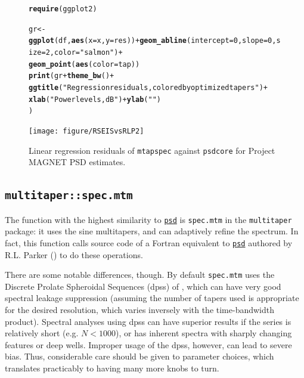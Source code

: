 \documentclass[10pt]{article}\usepackage[]{graphicx}\usepackage[]{color}
\makeatletter
\newcommand{\hlnum}[1]{\textcolor[rgb]{0.686,0.059,0.569}{#1}}%
\newcommand{\hlstr}[1]{\textcolor[rgb]{0.192,0.494,0.8}{#1}}%
\newcommand{\hlopt}[1]{\textcolor[rgb]{0,0,0}{#1}}%
\newcommand{\hlstd}[1]{\textcolor[rgb]{0.345,0.345,0.345}{#1}}%
\newcommand{\hlkwb}[1]{\textcolor[rgb]{0.69,0.353,0.396}{#1}}%
\newcommand{\hlkwc}[1]{\textcolor[rgb]{0.333,0.667,0.333}{#1}}%
\newcommand{\hlkwd}[1]{\textcolor[rgb]{0.737,0.353,0.396}{\textbf{#1}}}%
\newenvironment{kframe}{%
 \def\at@end@of@kframe{}%
 \ifinner\ifhmode%
  \def\at@end@of@kframe{\end{minipage}}%
  \begin{minipage}{\columnwidth}%
 \fi\fi%
 \def\FrameCommand##1{\hskip\@totalleftmargin \hskip-\fboxsep
 \colorbox{shadecolor}{##1}\hskip-\fboxsep
     \hskip-\linewidth \hskip-\@totalleftmargin \hskip\columnwidth}%
 \MakeFramed {\advance\hsize-\width
   \@totalleftmargin\z@ \linewidth\hsize
   \@setminipage}}%
 {\par\unskip\endMakeFramed%
 \at@end@of@kframe}
\newenvironment{knitrout}{}{} %
\newcommand{\Rcmd}[1]{\texttt{#1}}
\newcommand{\psd}[0]{\href{http://abarbour.github.com/psd/}{\color{blue}\Rcmd{psd}}}
\makeatother
\begin{document}
\begin{figure}[htb!]
\begin{center}
\begin{knitrout}
\color{fgcolor}\begin{kframe}
\begin{alltt}
\hlkwd{require}\hlstd{(ggplot2)}
\end{alltt}


{\ttfamily\noindent\itshape\color{messagecolor}{\#\# Loading required package: ggplot2}}\begin{alltt}
\hlstd{gr} \hlkwb{<-} \hlkwd{ggplot}\hlstd{(df,} \hlkwd{aes}\hlstd{(}\hlkwc{x}\hlstd{=x,} \hlkwc{y}\hlstd{=res))} \hlopt{+} \hlkwd{geom_abline}\hlstd{(}\hlkwc{intercept}\hlstd{=}\hlnum{0}\hlstd{,} \hlkwc{slope}\hlstd{=}\hlnum{0}\hlstd{,} \hlkwc{size}\hlstd{=}\hlnum{2}\hlstd{,} \hlkwc{color}\hlstd{=}\hlstr{"salmon"}\hlstd{)} \hlopt{+}
\hlkwd{geom_point}\hlstd{(}\hlkwd{aes}\hlstd{(}\hlkwc{color}\hlstd{=tap))}
\hlkwd{print}\hlstd{(gr} \hlopt{+} \hlkwd{theme_bw}\hlstd{()} \hlopt{+}
\hlkwd{ggtitle}\hlstd{(}\hlstr{"Regression residuals, colored by optimized tapers"}\hlstd{)}\hlopt{+}
\hlkwd{xlab}\hlstd{(}\hlstr{"Power levels, dB"}\hlstd{)} \hlopt{+} \hlkwd{ylab}\hlstd{(}\hlstr{""}\hlstd{)}
\hlstd{)}
\end{alltt}
\end{kframe}
\texttt{[image: figure/RSEISvsRLP2]} 

\end{knitrout}
\caption{Linear regression residuals of
\Rcmd{mtapspec} against \Rcmd{psdcore} for Project MAGNET PSD estimates.}
\label{fig:psdreg}
\end{center}
\end{figure}

\subsection{\Rcmd{multitaper::spec.mtm}}
The function with the highest similarity to \psd{} is
\Rcmd{spec.mtm} in the \Rcmd{multitaper} package: it uses
the sine multitapers, and can adaptively refine the spectrum.
In fact, this function
calls source code of a Fortran equivalent to \psd{}
authored by R.L. Parker (\citeyear{parkerweb}) to do these operations.

There are some notable differences, though.  
By default \Rcmd{spec.mtm}
 uses the Discrete Prolate Spheroidal Sequences (dpss) 
of \citet{thomson1982},
which can have very good spectral leakage suppression (assuming
the number of tapers used is appropriate for the 
desired resolution, which varies inversely with the time-bandwidth product).
Spectral analyses using dpss can have superior results if the series is
relatively short (e.g. $N < 1000$), or has inherent spectra
with sharply changing features or
deep wells.
Improper usage of the dpss, however, can lead to severe bias.
Thus, considerable care should be given to parameter choices, 
which translates practicably
to having many more knobs to turn.
\end{document}
